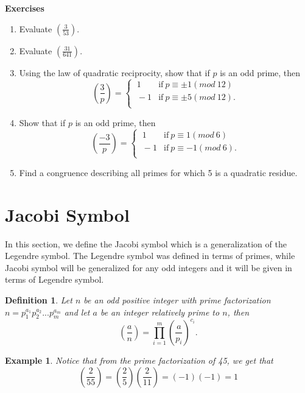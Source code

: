 \documentclass[12pt,letterpaper]{book}
\newtheorem{definition}{Definition}
\newtheorem{example}{Example}
\begin{document}
\textbf{Exercises}
\begin{enumerate}
\item{Evaluate $\left(\frac{3}{53}\right)$.}\item{Evaluate
$\left(\frac{31}{641}\right)$.}\item{Using the law of quadratic
reciprocity, show that if $p$ is an odd prime, then
\[\left(\frac{3}{p}\right)=\left\{\begin{array}{lcr}
\ 1  &{\mbox{if}\  p\equiv \pm1(mod \ 12)} \\
\ -1  &{\mbox{if}\  p\equiv \pm 5(mod \ 12)}. \\
\end{array}\right .\]}\item{Show that if $p$ is an odd prime, then
\[\left(\frac{-3}{p}\right)=\left\{\begin{array}{lcr}
\ 1  &{\mbox{if}\  p\equiv 1(mod \ 6)} \\
\ -1  &{\mbox{if}\  p\equiv -1 (mod \ 6)}. \\
\end{array}\right .\]}\item{Find a congruence describing all primes for which 5 is a quadratic residue.}
\end{enumerate}

\newpage

\section{Jacobi Symbol}
In this section, we define the Jacobi symbol which is a
generalization of the Legendre symbol.  The Legendre symbol was
defined in terms of primes, while Jacobi symbol will be generalized
for any odd integers and it will be given in terms of Legendre
symbol. 
\begin{definition}
Let $n$ be an odd positive integer with prime factorization
$n=p_1^{a_1}p_2^{a_2}...p_m^{a_m}$ and let $a$ be an integer
relatively prime to $n$, then
\begin{equation*}
\left(\frac{a}{n}\right)=\prod_{i=1}^m\left(\frac{a}{p_i}\right)^{c_i}.
\end{equation*}
\end{definition}

\begin{example}
Notice that from the prime factorization of 45, we get that
\begin{equation*}
\left(\frac{2}{55}\right)=\left(\frac{2}{5}\right)\left(\frac{2}{11}\right)=(-1)(-1)=1
\end{equation*}
\end{example}
\end{document}
